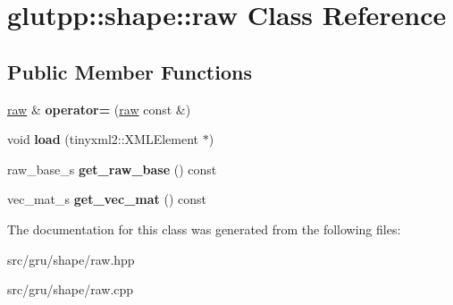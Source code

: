 \hypertarget{classglutpp_1_1shape_1_1raw}{\section{glutpp\-:\-:shape\-:\-:raw \-Class \-Reference}
\label{classglutpp_1_1shape_1_1raw}
}
\subsection*{\-Public \-Member \-Functions}
\begin{DoxyCompactItemize}
\item 
\hypertarget{classglutpp_1_1shape_1_1raw_a57c3bb584dda8145c549907aab199bf4}{\hyperlink{classglutpp_1_1shape_1_1raw}{raw} \& {\bfseries operator=} (\hyperlink{classglutpp_1_1shape_1_1raw}{raw} const \&)}\label{classglutpp_1_1shape_1_1raw_a57c3bb584dda8145c549907aab199bf4}

\item 
\hypertarget{classglutpp_1_1shape_1_1raw_ab8431d0816f90a4b04fc727972137bf2}{void {\bfseries load} (tinyxml2\-::\-X\-M\-L\-Element $\ast$)}\label{classglutpp_1_1shape_1_1raw_ab8431d0816f90a4b04fc727972137bf2}

\item 
\hypertarget{classglutpp_1_1shape_1_1raw_a528b7f49eeae651efbbfa89fda0cd314}{raw\-\_\-base\-\_\-s {\bfseries get\-\_\-raw\-\_\-base} () const }\label{classglutpp_1_1shape_1_1raw_a528b7f49eeae651efbbfa89fda0cd314}

\item 
\hypertarget{classglutpp_1_1shape_1_1raw_ad81732d7384f51497e25ed6d520c86dd}{vec\-\_\-mat\-\_\-s {\bfseries get\-\_\-vec\-\_\-mat} () const }\label{classglutpp_1_1shape_1_1raw_ad81732d7384f51497e25ed6d520c86dd}

\end{DoxyCompactItemize}


\-The documentation for this class was generated from the following files\-:\begin{DoxyCompactItemize}
\item 
src/gru/shape/raw.\-hpp\item 
src/gru/shape/raw.\-cpp\end{DoxyCompactItemize}
